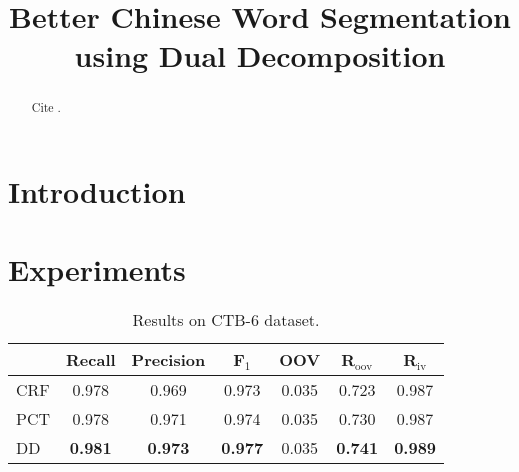 \documentclass[11pt]{article}
\title{Better Chinese Word Segmentation using Dual Decomposition}
\date{}
\begin{document}
\maketitle
\begin{abstract}

Cite \cite{Sun:2013:IPM}.

\end{abstract}

\section{Introduction}

\section{Experiments}





\begin{table}[h]
\centering
\begin{small}
\begin{tabular}{  l | c | c | c | c | c | c   }
 &  \multicolumn{1}{c}{Recall} &  \multicolumn{1}{c}{Precision}  & \multicolumn{1}{c}{F$_1$}   &  \multicolumn{1}{c}{OOV} &   \multicolumn{1}{c|}{R$_{\mathrm{oov}}$}    &  \multicolumn{1}{c}{R$_{\mathrm{iv}}$}   \\ 

\hline
CRF          & 0.978  &  0.969  &  0.973   & 0.035  & 0.723 & 0.987 \\
PCT      & 0.978 & 0.971 & 0.974 & 0.035 & 0.730 & 0.987 \\
DD     & \textbf{0.981} & \textbf{0.973} & \textbf{0.977} & 0.035 & \textbf{0.741} & \textbf{0.989} \\
\end{tabular} 
\caption{Results on CTB-6 dataset. }\label{tbl:ctb-results}
\end{small}
\end{table}


\addtocounter{footnote}{-1}
\end{document}
